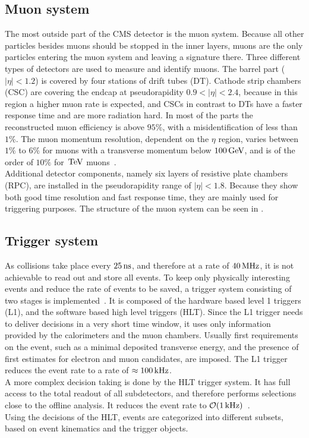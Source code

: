 \subsection{Muon system}
The most outside part of the CMS detector is the muon system. Because all other particles besides muons should be stopped in the inner layers, muons are the only particles entering the muon system and leaving a signature there. Three different types of detectors are used to measure and identify muons. The barrel part ($|\eta|<1.2$) is covered by four stations of drift tubes (DT). Cathode strip chambers (CSC) are covering the endcap at pseudorapidity $0.9<|\eta|<2.4$, because in this region a higher muon rate is expected, and CSCs in contrast to DTs have a faster response time and are more radiation hard. In most of the parts the reconstructed muon efficiency is above $95\%$, with a misidentification of less than $1\%$. The muon momentum resolution, dependent on the $\eta$ region, varies between $1\%$ to $6\%$ for muons with a transverse momentum below $100\,\text{Ge\hspace{-.08em}V}$, and is of the order of $10\%$ for $\,\text{Te\hspace{-.08em}V}$ muons~\cite{MuonPerformance}.\\
Additional detector components, namely six layers of resistive plate chambers (RPC), are installed in the pseudorapidity range of $|\eta|<1.8$. Because they show both good time resolution and fast response time, they are mainly used for triggering purposes. The structure of the muon system can be seen in .

\subsection{Trigger system}
As collisions take place every $25\,\text{ns}$, and therefore at a rate of $40\,\text{MHz}$, it is not achievable to read out and store all events. To keep only physically interesting events and reduce the rate of events to be saved, a trigger system consisting of two stages is implemented~\cite{TriggerSystem}. It is composed of the hardware based level 1 triggers (L1), and the software based high level triggers (HLT). Since the L1 trigger needs to deliver decisions in a very short time window, it uses only information provided by the calorimeters and the muon chambers. Usually first requirements on the event, such as a minimal deposited transverse energy, and  the presence of first estimates for electron and muon candidates, are imposed. The L1 trigger reduces the event rate to a rate of $\approx100\,\text{kHz}$.\\
A more complex decision taking is done by the HLT trigger system. It has full access to the total readout of all subdetectors, and therefore performs selections close to the offline analysis. It reduces the event rate to $\mathcal{O}(1\,\text{kHz})$~\cite{TriggerRate}.\\
Using the decisions of the HLT, events are categorized into different subsets, based on event kinematics and the trigger objects.
